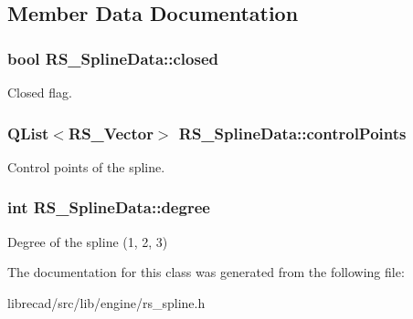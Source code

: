 \subsection{Member Data Documentation}
\hypertarget{classRS__SplineData_af13d7e07673261f399b15ca310932a17}{
\subsubsection[{closed}]{\setlength{\rightskip}{0pt plus 5cm}bool R\-S\-\_\-\-Spline\-Data\-::closed}}\label{classRS__SplineData_af13d7e07673261f399b15ca310932a17}
Closed flag. \hypertarget{classRS__SplineData_ac6f85522c2d0dbafe00fa3f2190d76ab}{
\subsubsection[{control\-Points}]{\setlength{\rightskip}{0pt plus 5cm}Q\-List$<${\bf R\-S\-\_\-\-Vector}$>$ R\-S\-\_\-\-Spline\-Data\-::control\-Points}}\label{classRS__SplineData_ac6f85522c2d0dbafe00fa3f2190d76ab}
Control points of the spline. \hypertarget{classRS__SplineData_ad6a4cc91215ce6619c36eeabb68ed801}{
\subsubsection[{degree}]{\setlength{\rightskip}{0pt plus 5cm}int R\-S\-\_\-\-Spline\-Data\-::degree}}\label{classRS__SplineData_ad6a4cc91215ce6619c36eeabb68ed801}
Degree of the spline (1, 2, 3) 

The documentation for this class was generated from the following file\-:\begin{DoxyCompactItemize}
\item 
librecad/src/lib/engine/rs\-\_\-spline.\-h\end{DoxyCompactItemize}
